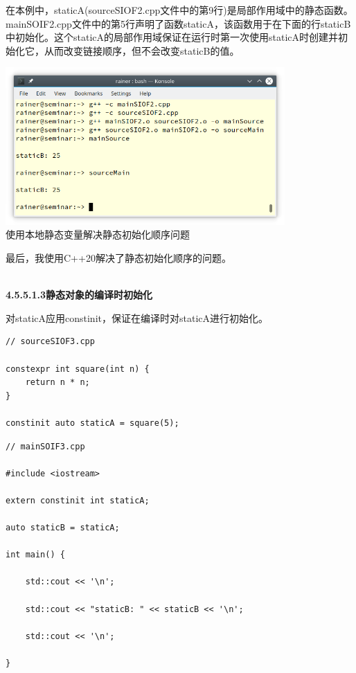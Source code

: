 在本例中，staticA(sourceSIOF2.cpp文件中的第9行)是局部作用域中的静态函数。mainSOIF2.cpp文件中的第5行声明了函数staticA，该函数用于在下面的行staticB中初始化。这个staticA的局部作用域保证在运行时第一次使用staticA时创建并初始化它，从而改变链接顺序，但不会改变staticB的值。

\begin{center}
\includegraphics[width=0.8\textwidth]{content/3/chapter4/images/38.png}\\
使用本地静态变量解决静态初始化顺序问题
\end{center}

最后，我使用C++20解决了静态初始化顺序的问题。

\hspace*{\fill} \\ %
\noindent
\textbf{4.5.5.1.3\hspace{0.2cm}静态对象的编译时初始化}

对staticA应用constinit，保证在编译时对staticA进行初始化。

\begin{lstlisting}[style=styleCXX]
// sourceSIOF3.cpp

constexpr int square(int n) {
	return n * n;
}

constinit auto staticA = square(5);
\end{lstlisting}

\begin{lstlisting}[style=styleCXX]
// mainSOIF3.cpp

#include <iostream>

extern constinit int staticA;

auto staticB = staticA;

int main() {
	
	std::cout << '\n';
	
	std::cout << "staticB: " << staticB << '\n';
	
	std::cout << '\n';

}
\end{lstlisting}

